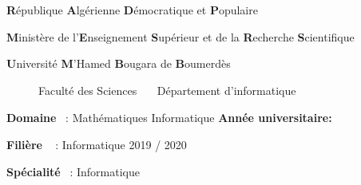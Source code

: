 \documentclass[12pt]{report}
\begin{document}
\begin{titlepage}



   \begin{center}
       \vspace*{-0.4in}

       \begin{large}

           \textbf{R}épublique \textbf{A}lgérienne \textbf{D}émocratique et \textbf{P}opulaire

           \textbf{M}inistère de l'\textbf{E}nseignement \textbf{S}upérieur et de la \textbf{R}echerche \textbf{S}cientifique

           \textbf{U}niversité \textbf{M}'Hamed \textbf{B}ougara de \textbf{B}oumerdès

       \end{large}

       \vspace{0.1in}

       \begin{figure}[h]
       \hspace{0.35in}
           \Large{Faculté des Sciences}$
       \hspace{0.2in}
       \begin{array}{l}
       \centering
       \end{array}
       \hspace{-0.1in}
           $\Large{Département d'informatique}
       \hspace{-0.5in}
       \end{figure}
   \end{center}

    \hspace{0.2in}
    \large{\textbf{Domaine} \,\; : Mathématiques Informatique}
    \kern 1in
    \large{\textbf{Année universitaire:}}

    \hspace{0.2in}
    \large{\textbf{Filière} \quad\,\,\, : Informatique}
    \kern 2.65in
    2019 / 2020

    \hspace{0.2in}
    \large{\textbf{Spécialité} \, : Informatique}


\end{titlepage}
\end{document}

